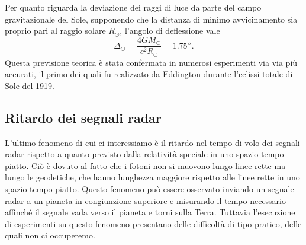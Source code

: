 Per quanto riguarda la deviazione dei raggi di luce da parte del campo
gravitazionale del Sole, supponendo che la distanza di minimo avvicinamento sia
proprio pari al raggio solare $R_{\odot}$, l'angolo di deflessione vale
\begin{equation}
  \Delta_{\odot} = \frac{4GM_{\odot}}{c^{2}R_{\odot}} = \ang{;;1.75}.
\end{equation}
Questa previsione teorica è stata confermata in numerosi esperimenti via via più
accurati, il primo dei quali fu realizzato da Eddington durante l'eclissi totale
di Sole del 1919.

\subsection{Ritardo dei segnali radar}
\label{sec:ritardo-radar}

L'ultimo fenomeno di cui ci interessiamo è il ritardo nel tempo di volo dei
segnali radar rispetto a quanto previsto dalla relatività speciale in uno
spazio-tempo piatto.  Ciò è dovuto al fatto che i fotoni non si muovono lungo
linee rette ma lungo le geodetiche, che hanno lunghezza maggiore rispetto alle
linee rette in uno spazio-tempo piatto.  Questo fenomeno può essere osservato
inviando un segnale radar a un pianeta in congiunzione superiore e misurando il
tempo necessario affinché il segnale vada verso il pianeta e torni sulla Terra.
Tuttavia l'esecuzione di esperimenti su questo fenomeno presentano delle
difficoltà di tipo pratico, delle quali non ci occuperemo.

